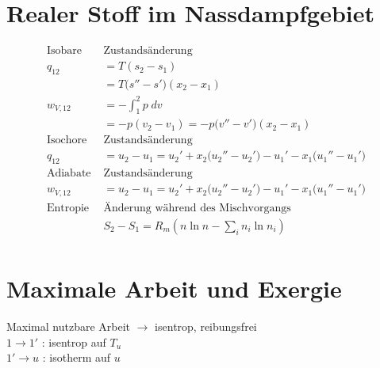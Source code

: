 \documentclass[twocolumn]{article}
\begin{document}
\section{Realer Stoff im Nassdampfgebiet}
\begin{align*}
	\text{Isobare } &\text{Zustandsänderung} \\
	q_{12} &= T(s_2 - s_1) \\
	&= T\Big(s'' - s'\Big)(x_2-x_1) \\
	w_{V,12} &= - \int_{1}^{2} p\; dv \\
	&= -p(v_2-v_1) = -p\Big(v'' -v'\Big)(x_2-x_1) \\
	\text{Isochore } &\text{Zustandsänderung} \\
	q_{12} &= u_2 - u_1 = u_2' + x_2\Big(u_2'' - u_2' \Big) - u_1' - x_1\Big(u_1'' - u_1'\Big) \\
	\text{Adiabate } &\text{Zustandsänderung} \\
	w_{V,12} &= u_2 - u_1 = u_2' + x_2 \Big( u_2'' - u_2' \Big) - u_1' - x_1\Big(u_1'' - u_1'\Big) \\
	\text{Entropie} & \text{Änderung während des Mischvorgangs} \\
	&S_2-S_1 = R_m \left ( n \ln n - \sum_{i}^{} n_i \ln n_i \right ) \\
\end{align*}


\section{Maximale Arbeit und Exergie}
Maximal nutzbare Arbeit $\rightarrow$ isentrop, reibungsfrei \\
$1 \rightarrow 1'$ : isentrop auf $T_u$ \\
$1' \rightarrow u$ : isotherm auf $u$ 
\end{document}
